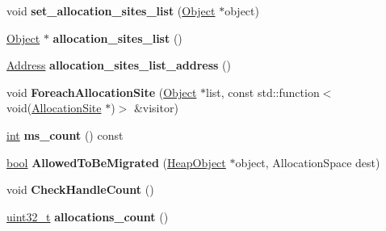 \begin{DoxyCompactItemize}
\mbox{\label{classv8_1_1internal_1_1Heap_a7c7101ce342e3d0fb9ae41cdea3c27d7}} 
void {\bfseries set\+\_\+allocation\+\_\+sites\+\_\+list} (\mbox{\hyperlink{classv8_1_1internal_1_1Object}{Object}} $\ast$object)
\item 
\mbox{\label{classv8_1_1internal_1_1Heap_a482eaa801f2ddc85a96dbe42d9591eda}} 
\mbox{\hyperlink{classv8_1_1internal_1_1Object}{Object}} $\ast$ {\bfseries allocation\+\_\+sites\+\_\+list} ()
\item 
\mbox{\label{classv8_1_1internal_1_1Heap_a9b52a2296f5b68a9b391e91ccc1ad8bc}} 
\mbox{\hyperlink{classuintptr__t}{Address}} {\bfseries allocation\+\_\+sites\+\_\+list\+\_\+address} ()
\item 
\mbox{\label{classv8_1_1internal_1_1Heap_afac487f91e226417c3aa532349a1727a}} 
void {\bfseries Foreach\+Allocation\+Site} (\mbox{\hyperlink{classv8_1_1internal_1_1Object}{Object}} $\ast$list, const std\+::function$<$ void(\mbox{\hyperlink{classv8_1_1internal_1_1AllocationSite}{Allocation\+Site}} $\ast$)$>$ \&visitor)
\item 
\mbox{\label{classv8_1_1internal_1_1Heap_a48c466318b7cd3431ad136c77703be9b}} 
\mbox{\hyperlink{classint}{int}} {\bfseries ms\+\_\+count} () const
\item 
\mbox{\label{classv8_1_1internal_1_1Heap_a6afbe2cbd6f999c32a9179b2558e3978}} 
\mbox{\hyperlink{classbool}{bool}} {\bfseries Allowed\+To\+Be\+Migrated} (\mbox{\hyperlink{classv8_1_1internal_1_1HeapObject}{Heap\+Object}} $\ast$object, Allocation\+Space dest)
\item 
\mbox{\label{classv8_1_1internal_1_1Heap_a681c0f8989fff3c18c4659a990da4712}} 
void {\bfseries Check\+Handle\+Count} ()
\item 
\mbox{\label{classv8_1_1internal_1_1Heap_a3e8866dba0ce694b4f826228545b9c01}} 
\mbox{\hyperlink{classuint32__t}{uint32\+\_\+t}} {\bfseries allocations\+\_\+count} ()
\item 
\mbox{\label{classv8_1_1internal_1_1Heap_abc8708f833d8dee1ed93051d3fb4690e}} 

\end{DoxyCompactItemize}
